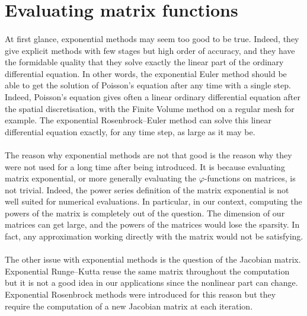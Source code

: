   \section{Evaluating matrix functions}

    \paragraph{}
    At first glance, exponential methods may seem too good to be true.
    Indeed, they give explicit methods with few stages but high order of accuracy, and they have the formidable quality that they solve exactly the linear part of the ordinary differential equation.
    In other words, the exponential Euler method should be able to get the solution of Poisson's equation after any time with a single step.
    Indeed, Poisson's equation gives often a linear ordinary differential equation after the spatial discretisation, with the Finite Volume method on a regular mesh for example.
    The exponential Rosenbrock--Euler method can solve this linear differential equation exactly, for any time step, as large as it may be.

    \paragraph{}
    The reason why exponential methods are not that good is the reason why they were not used for a long time after being introduced.
    It is because evaluating matrix exponential, or more generally evaluating the $\varphi$-functions on matrices, is not trivial.
    Indeed, the power series definition of the matrix exponential is not well suited for numerical evaluations.
    In particular, in our context, computing the powers of the matrix is completely out of the question.
    The dimension of our matrices can get large, and the powers of the matrices would lose the sparsity.
    In fact, any approximation working directly with the matrix would not be satisfying.

    \paragraph{}
    The other issue with exponential methods is the question of the Jacobian matrix.
    Exponential Runge--Kutta reuse the same matrix throughout the computation but it is not a good idea in our applications since the nonlinear part can change.
    Exponential Rosenbrock methods were introduced for this reason but they require the computation of a new Jacobian matrix at each iteration.


